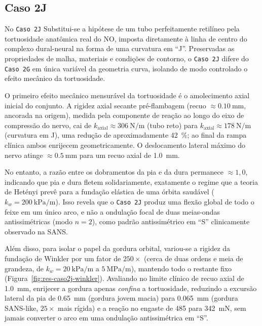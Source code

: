 \documentclass[12pt,a4paper]{article}
\begin{document}
\subsection*{Caso 2J}
\label{sec:res-caso2.2}
No \texttt{Caso 2J} Substitui-se a hipótese de um tubo perfeitamente retilíneo pela tortuosidade anatômica real do NO, imposta diretamente à linha de centro do complexo dural-neural na forma de uma curvatura em ``J''. Preservadas as propriedades de malha, materiais e condições de contorno, o \texttt{Caso 2J} difere do \texttt{Caso 2G} em única variável da geometria curva, isolando de modo controlado o efeito mecânico da tortuosidade.

O primeiro efeito mecânico mensurável da tortuosidade é o amolecimento axial inicial do conjunto. A rigidez axial secante pré-flambagem (recuo $\approx \SI{0.10}{\milli\meter}$, ancorada na origem), medida pela componente de reação ao longo do eixo de compressão do nervo, cai de $k_{\mathrm{axial}} \approx \SI{306}{\newton\per\meter}$ (tubo reto) para $k_{\mathrm{axial}} \approx \SI{178}{\newton\per\meter}$ (curvatura em J), uma redução de aproximadamente \SI{42}{\%}; ao final da rampa clínica ambos enrijecem geometricamente. O deslocamento lateral máximo do nervo atinge $\approx \SI{0.5}{\milli\meter}$ para um recuo axial de \SI{1.0}{\milli\meter}.

No entanto, a razão entre os dobramentos da pia e da dura permanece $\approx 1{,}0$, indicando que pia e dura fletem solidariamente, exatamente o regime que a teoria de Hetényi prevê para a fundação elástica de uma órbita saudável ($k_w = \SI{200}{\kilo\pascal\per\meter}$). Isso revela que o \texttt{Caso 2J} produz uma flexão global de todo o feixe em um único arco, e não a ondulação focal de duas meias-ondas antissimétricas (modo $n = 2$), como padrão antissimétrico em ``S'' clinicamente observado na SANS. 

Além disso, para isolar o papel da gordura orbital, variou-se a rigidez da fundação de Winkler por um fator de $250\times$ (cerca de duas ordens e meia de grandeza, de $k_w = \SI{20}{\kilo\pascal\per\meter}$ a $\SI{5}{\mega\pascal\per\meter}$), mantendo todo o restante fixo (Figura~\ref{fig:res-caso2j-winkler}). Avaliando no limite clínico de recuo axial de \SI{1.0}{\milli\meter}, enrijecer a gordura apenas \emph{confina} a tortuosidade, reduzindo a excursão lateral da pia de \SI{0.65}{\milli\meter} (gordura jovem macia) para \SI{0.065}{\milli\meter} (gordura SANS-like, $25\times$ mais rígida) e a reação no engaste de \SI{485}{} para \SI{342}{\milli\newton}, sem jamais converter o arco em uma ondulação antissimétrica em ``S''.
\end{document}
